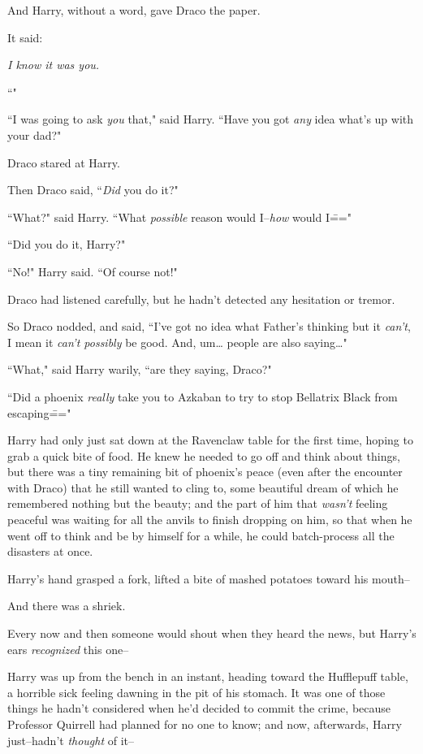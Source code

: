 And Harry, without a word, gave Draco the paper.

It said:

\emph{I know it was you.}

``\emph{}"

``I was going to ask \emph{you} that," said Harry. ``Have you got \emph{any} idea what's up with your dad?"

Draco stared at Harry.

Then Draco said, ``\emph{Did} you do it?"

``What?" said Harry. ``What \emph{possible} reason would I\---\emph{how} would I\==="

``Did you do it, Harry?"

``No!" Harry said. ``Of course not!"

Draco had listened carefully, but he hadn't detected any hesitation or tremor.

So Draco nodded, and said, ``I've got no idea what Father's thinking but it \emph{can't}, I mean it \emph{can't possibly} be good. And, um{\ldots} people are also saying{\ldots}"

``What," said Harry warily, ``are they saying, Draco?"

``Did a phoenix \emph{really} take you to Azkaban to try to stop Bellatrix Black from escaping\==="


Harry had only just sat down at the Ravenclaw table for the first time, hoping to grab a quick bite of food. He knew he needed to go off and think about things, but there was a tiny remaining bit of phoenix's peace (even after the encounter with Draco) that he still wanted to cling to, some beautiful dream of which he remembered nothing but the beauty; and the part of him that \emph{wasn't} feeling peaceful was waiting for all the anvils to finish dropping on him, so that when he went off to think and be by himself for a while, he could batch-process all the disasters at once.

Harry's hand grasped a fork, lifted a bite of mashed potatoes toward his mouth\---

And there was a shriek.

Every now and then someone would shout when they heard the news, but Harry's ears \emph{recognized} this one\---

Harry was up from the bench in an instant, heading toward the Hufflepuff table, a horrible sick feeling dawning in the pit of his stomach. It was one of those things he hadn't considered when he'd decided to commit the crime, because Professor Quirrell had planned for no one to know; and now, afterwards, Harry just\---hadn't \emph{thought} of it\---

